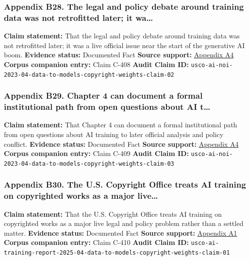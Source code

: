 \documentclass[
  american,
  11pt,
  letterpaper,
]{article}
\begin{document}
\subsubsection{Appendix B28. The legal and policy debate around training
data was not retrofitted later; it
wa\ldots{}}\label{ch-04-appendix-b28-the-legal-and-policy-debate-around-training-data-was-not-retrofitted-later-it-wa}

\textbf{Claim statement:} That the legal and policy debate around
training data was not retrofitted later; it was a live official issue
near the start of the generative AI boom. \textbf{Evidence status:}
Documented Fact \textbf{Source support:}
\hyperref[ch-04-appendix-a4-copyright-and-artificial-intelligence-notice-of-inquiry]{Appendix
A4} \textbf{Corpus companion entry:} Claim C-408 \textbf{Audit Claim
ID:}
\texttt{usco-ai-noi-2023-04-data-to-models-copyright-weights-claim-02}

\subsubsection{Appendix B29. Chapter 4 can document a formal
institutional path from open questions about AI
t\ldots{}}\label{ch-04-appendix-b29-chapter-4-can-document-a-formal-institutional-path-from-open-questions-about-ai-t}

\textbf{Claim statement:} That Chapter 4 can document a formal
institutional path from open questions about AI training to later
official analysis and policy conflict. \textbf{Evidence status:}
Documented Fact \textbf{Source support:}
\hyperref[ch-04-appendix-a4-copyright-and-artificial-intelligence-notice-of-inquiry]{Appendix
A4} \textbf{Corpus companion entry:} Claim C-409 \textbf{Audit Claim
ID:}
\texttt{usco-ai-noi-2023-04-data-to-models-copyright-weights-claim-03}

\subsubsection{Appendix B30. The U.S. Copyright Office treats AI
training on copyrighted works as a major
live\ldots{}}\label{ch-04-appendix-b30-the-u-s-copyright-office-treats-ai-training-on-copyrighted-works-as-a-major-live}

\textbf{Claim statement:} That the U.S. Copyright Office treats AI
training on copyrighted works as a major live legal and policy problem
rather than a settled matter. \textbf{Evidence status:} Documented Fact
\textbf{Source support:}
\hyperref[ch-04-appendix-a1-copyright-and-artificial-intelligence-part-3-generative-ai-training-pre-publication-version]{Appendix
A1} \textbf{Corpus companion entry:} Claim C-410 \textbf{Audit Claim
ID:}
\texttt{usco-ai-training-report-2025-04-data-to-models-copyright-weights-claim-01}
\end{document}
